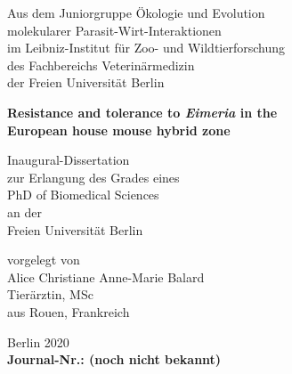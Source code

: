 \begin{titlepage}
    \begin{center}
        Aus dem Juniorgruppe Ökologie und Evolution \\
        molekularer Parasit-Wirt-Interaktionen \\
        im Leibniz-Institut für Zoo- und Wildtierforschung \\
        des Fachbereichs Veterinärmedizin \\
        der Freien Universität Berlin
        
        \vfill
        \textbf{{\Large Resistance and tolerance to \textit{Eimeria} in the \\European house mouse hybrid zone}}
 
       \vfill
 
        Inaugural-Dissertation \\
        zur Erlangung des Grades eines \\
        PhD of Biomedical Sciences \\
        an der \\
        Freien Universität Berlin
 
        \vfill

        vorgelegt von \\
        Alice Christiane Anne-Marie Balard \\
        Tierärztin, MSc \\
        aus Rouen, Frankreich
        
        \vfill
        
        Berlin 2020 \\
        \textbf{Journal-Nr.: (noch nicht bekannt)}

    \end{center}
\end{titlepage}
